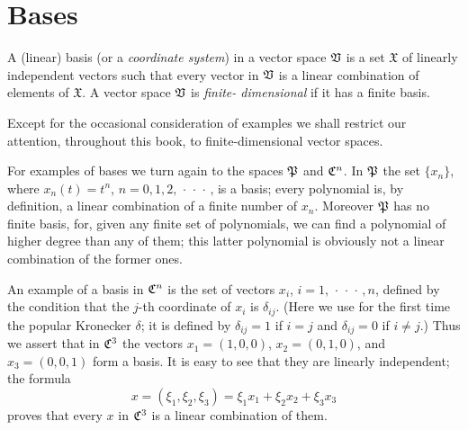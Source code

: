 \section{Bases}\label{sec-bases}

\begin{definition}
    A (linear) basis (or a \emph{coordinate system}) in a vector space \(
    \mathfrak{V}\) is a set \(\mathfrak{X}\) of linearly independent vectors such that
    every vector in \(  \mathfrak{V}\) is a linear combination of elements of
    \(\mathfrak{X}\). A vector space \(  \mathfrak{V}\) is \emph{finite- dimensional}
    if it has a finite basis.
\end{definition}

Except for the occasional consideration of examples we shall restrict our attention, throughout this book, to finite-dimensional vector spaces.

For examples of bases we turn again to the spaces \(\mathfrak{P}\) and
\(\mathfrak{C}^n\). In \(\mathfrak{P}\) the set \(\{x_n\}\), where \(x_n(t) = t^n\), \(n
= 0, 1, 2, \,\cdot\,\cdot\,\cdot\,\), is a basis; every polynomial is, by
definition, a linear combination of a finite number of \(x_n\). Moreover
\(\mathfrak{P}\) has no finite basis, for, given any finite set of polynomials, we
can find a polynomial of higher degree than any of them; this latter polynomial
is obviously not a linear combination of the former ones.

An example of a basis in \(\mathfrak{C}^n\) is the set of vectors \(x_i\), \(i = 1,
\,\cdot\,\cdot\,\cdot\,, n\), defined by the condition that the \(j\)-th
coordinate of \(x_i\) is \(\delta_{ij}\). (Here we use for the first time the
popular Kronecker \(\delta\); it is defined by \(\delta_{ij} = 1\) if \(i = j\)
and \(\delta_{ij} = 0\) if \(i \neq j\).) Thus we assert that in \(\mathfrak{C}^3\)
the vectors \(x_1 = (1,0,0)\), \(x_2 = (0,1,0)\), and \(x_3 = (0,0,1)\) form a
basis. It is easy to see that they are linearly independent; the formula
\begin{equation*}
    x = (\xi_1, \xi_2, \xi_3) = \xi_1 x_1 + \xi_2 x_2 + \xi_3 x_3
\end{equation*}
proves that every \(x\) in \(\mathfrak{C}^3\) is a linear combination of them.

